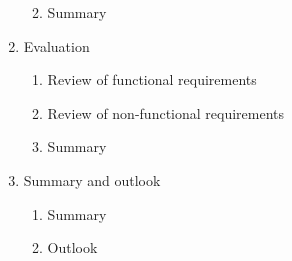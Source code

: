\begin{enumerate}
\begin{enumerate}
\begin{enumerate}
		\end{enumerate}
		\item Summary
	\end{enumerate}
	\item Evaluation
	\begin{enumerate}
		\item Review of functional requirements
		\item Review of non-functional requirements
		\item Summary
	\end{enumerate}
	\item Summary and outlook
	\begin{enumerate}
		\item Summary
		\item Outlook
	\end{enumerate}
\end{enumerate}